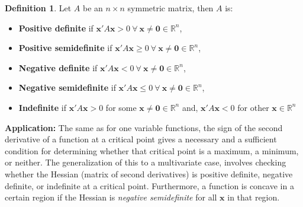 \documentclass[a4paper,11pt]{article}
\theoremstyle{definition}
\newtheorem{definition}{Definition}
\theoremstyle{plain}
\begin{document}
\begin{definition}
Let \(A\) be an \(n\times n\) symmetric matrix,
then \(A\) is:

\begin{itemize}
\item
  \textbf{Positive definite} if
  \(\mathbf{x}'A\mathbf{x} > 0 \: \forall \: \mathbf{x} \neq \mathbf{0}\in\mathbb{R}^n\),
\item
  \textbf{Positive semidefinite} if
  \(\mathbf{x}'A\mathbf{x} \geq 0 \: \forall \: \mathbf{x} \neq \mathbf{0}\in\mathbb{R}^n\),
\item
  \textbf{Negative definite} if
  \(\mathbf{x}'A\mathbf{x} < 0 \: \forall \: \mathbf{x} \neq \mathbf{0}\in\mathbb{R}^n\),
\item
  \textbf{Negative semidefinite} if
  \(\mathbf{x}'A\mathbf{x} \leq 0 \: \forall \: \mathbf{x} \neq \mathbf{0}\in\mathbb{R}^n\),
\item
  \textbf{Indefinite} if \(\mathbf{x}'A\mathbf{x} > 0\) for some
  \(\mathbf{x} \neq \mathbf{0}\in\mathbb{R}^n\) and,
  \(\mathbf{x}'A\mathbf{x} < 0\) for other \(\mathbf{x}\in\mathbb{R}^n\)
\end{itemize}
\end{definition}

\textbf{Application:} The same as for one variable functions, the sign
of the second derivative of a function at a critical point gives a
necessary and a sufficient condition for determining whether that
critical point is a maximum, a minimum, or neither. The generalization
of this to a multivariate case, involves checking whether the Hessian
(matrix of second derivatives) is positive definite, negative definite,
or indefinite at a critical point. Furthermore, a function is concave in
a certain region if the Hessian is \emph{negative semidefinite} for all
\(\mathbf{x}\) in that region.
\end{document}
